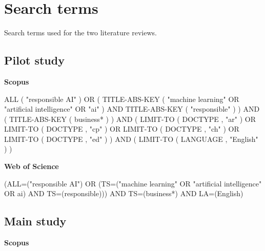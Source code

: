 \section{Search terms}
Search terms used for the two literature reviews.

\subsection{Pilot study}
\label{app:search-terms-pilot}

\textbf{Scopus}

\begin{verbatimBreakable}
ALL ( "responsible AI" )
OR (
TITLE-ABS-KEY ( "machine learning" OR "artificial intelligence" OR "ai" )
AND TITLE-ABS-KEY ( "responsible" )
)
AND (
TITLE-ABS-KEY ( business* )
)
AND (
LIMIT-TO ( DOCTYPE , "ar" )
OR LIMIT-TO ( DOCTYPE , "cp" )
OR LIMIT-TO ( DOCTYPE , "ch" )
OR LIMIT-TO ( DOCTYPE , "ed" )
)
AND (
LIMIT-TO ( LANGUAGE , "English" )
)
\end{verbatimBreakable}

\textbf{Web of Science}
\begin{verbatimBreakable}
(ALL=("responsible AI") OR (TS=("machine learning" OR "artificial intelligence" OR ai) AND TS=(responsible))) AND TS=(business*) AND LA=(English)
\end{verbatimBreakable}


\newpage
\subsection{Main study}
\label{app:search-terms-main}

\textbf{Scopus}

